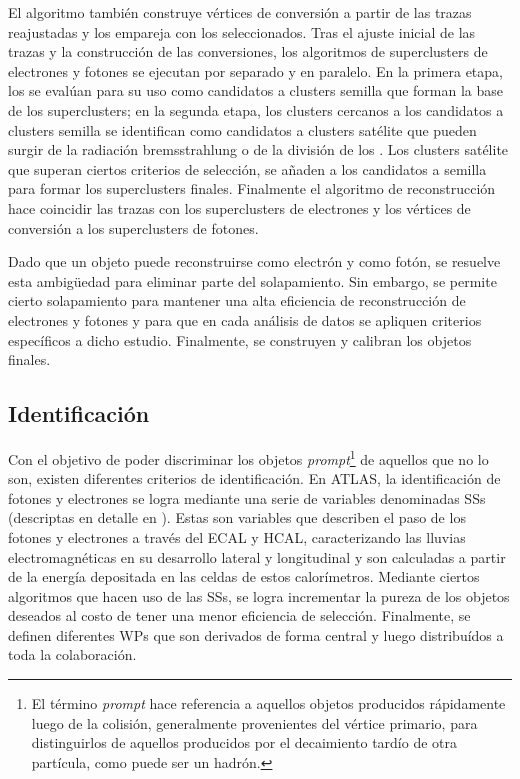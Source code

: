 El algoritmo también construye vértices de conversión a partir de las trazas reajustadas y los empareja con los \topos seleccionados.
Tras el ajuste inicial de las trazas y la construcción de las conversiones, los algoritmos de superclusters de electrones y fotones se ejecutan por separado y en paralelo. En la primera etapa, los \topos se evalúan para su uso como candidatos a clusters semilla que forman la base de los superclusters; en la segunda etapa, los clusters cercanos a los candidatos a clusters semilla se identifican como candidatos a clusters satélite que pueden surgir de la radiación bremsstrahlung o de la división de los \topos. Los clusters satélite que superan ciertos criterios de selección, se añaden a los candidatos a semilla para formar los superclusters finales.
Finalmente el algoritmo de reconstrucción hace coincidir las trazas con los superclusters de electrones y los vértices de conversión a los superclusters de fotones.

Dado que un objeto puede reconstruirse como electrón y como fotón, se resuelve esta ambigüedad para eliminar parte del solapamiento. Sin embargo, se permite cierto solapamiento para mantener una alta eficiencia de reconstrucción de electrones y fotones y para que en cada análisis de datos se apliquen criterios específicos a dicho estudio. Finalmente, se construyen y calibran los objetos finales.



\subsection{Identificación}
\label{subsec:objects:egamma:id}

Con el objetivo de poder discriminar los objetos \textit{prompt}\footnote{El término \textit{prompt} hace referencia a aquellos objetos producidos rápidamente luego de la colisión, generalmente provenientes del vértice primario, para distinguirlos de aquellos producidos por el decaimiento tardío de otra partícula, como puede ser un hadrón.} de aquellos que no lo son, existen diferentes criterios de identificación.
En \ac{ATLAS}, la identificación de fotones y electrones se logra mediante una serie de variables denominadas \acfp{SS} (descriptas en detalle en \Ch{\ref{ch:pid_ss}}). Estas son variables que describen el paso de los fotones y electrones a través del \ac{ECAL} y \ac{HCAL}, caracterizando las lluvias electromagnéticas en su desarrollo lateral y longitudinal y son calculadas a partir de la energía depositada en las celdas de estos calorímetros. Mediante ciertos algoritmos que hacen uso de las \acp{SS}, se logra incrementar la pureza de los objetos deseados al costo de tener una menor eficiencia de selección.
Finalmente, se definen diferentes \acp{WP} que son derivados de forma central y luego distribuídos a toda la colaboración.

